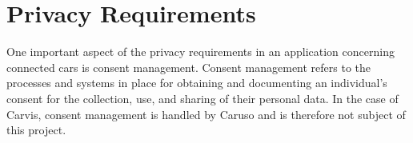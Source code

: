 \section{Privacy Requirements}
\label{sec:privacy}
One important aspect of the privacy requirements in an application concerning connected cars is consent management. Consent management refers to the processes and systems in place for obtaining and documenting an individual's consent for the collection, use, and sharing of their personal data. In the case of Carvis, consent management is handled by Caruso and is therefore not subject of this project.
